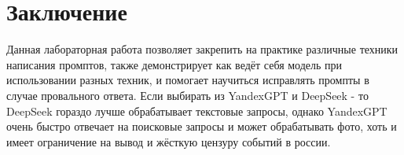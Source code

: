 \documentclass[oneside,a4paper,14pt]{extarticle} %
\begin{document}
	\section*{Заключение}
	\indent Данная лабораторная работа позволяет закрепить на практике различные техники написания промптов, также демонстрирует как ведёт себя модель при использовании разных техник, и помогает научиться исправлять промпты в случае провального ответа. Если выбирать из YandexGPT и DeepSeek - то DeepSeek гораздо лучше обрабатывает текстовые запросы, однако YandexGPT очень быстро отвечает на поисковые запросы и может обрабатывать фото, хоть и имеет ограничение на вывод и жёсткую цензуру событий в россии. 
\end{document}
